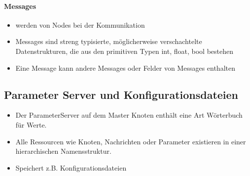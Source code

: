 \paragraph{Messages}
\begin{itemize}
	\item werden von Nodes bei der Kommunikation
	\item Messages sind streng typisierte, möglicherweise verschachtelte Datenstrukturen, die aus den primitiven Typen int, float, bool bestehen
	\item Eine Message kann andere Messages oder Felder von Messages enthalten
\end{itemize}
\subsection{Parameter Server und Konfigurationsdateien}
\begin{itemize}
	\item Der ParameterServer auf dem Master Knoten enthält eine Art Wörterbuch für Werte.
	\item Alle Ressourcen wie Knoten, Nachrichten oder Parameter existieren in einer hierarchischen Namensstruktur.
	\item Speichert z.B. Konfigurationsdateien
\end{itemize}




